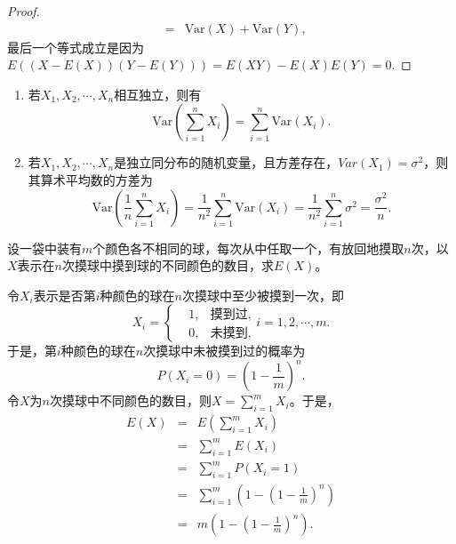 \begin{property}
\begin{enumerate}
\begin{enumerate}
\begin{proof}
\begin{eqnarray*}
        &=& \text{Var}(X)+\text{Var}(Y),
    \end{eqnarray*}
    最后一个等式成立是因为$E((X - E(X))(Y-E(Y))) = E(XY) - E(X)E(Y) = 0$.
    \end{proof}
    \begin{remark}
    \begin{enumerate}
        \item 若$X_1,X_2,\cdots,X_n$相互独立，则有
        $$
        \text{Var}\left(\sum_{i=1}^n X_i\right) = \sum_{i=1}^n \text{Var}(X_i).
        $$
        \item  若$X_1,X_2,\cdots,X_n$是独立同分布的随机变量，且方差存在，$Var(X_1) = \sigma^2$，则其算术平均数的方差为
        $$
       \text{Var}\left(\frac{1}{n}\sum_{i=1}^n X_i\right) = \frac{1}{n^2} \sum_{i=1}^n \text{Var}(X_i) = \frac{1}{n^2} \sum_{i=1}^n \sigma^2 = \frac{\sigma^2}{n}.
        $$
    \end{enumerate}
    \end{remark}
    \end{enumerate}
\end{enumerate}
\end{property}
\begin{example}
    设一袋中装有$m$个颜色各不相同的球，每次从中任取一个，有放回地摸取$n$次，以$X$表示在$n$次摸球中摸到球的不同颜色的数目，求$E(X)$。
\end{example}
\begin{solution}
令$X_i$表示是否第$i$种颜色的球在$n$次摸球中至少被摸到一次，即
$$
X_i = \left\{
\begin{aligned}
    & 1, & \text{摸到过,}\\
    & 0, & \text{未摸到,}
\end{aligned}\right.i=1,2,\cdots,m.
$$
于是，第$i$种颜色的球在$n$次摸球中未被摸到过的概率为
$$
P(X_i=0) = \left(1-\frac{1}{m} \right)^{n}. 
$$
令$X$为$n$次摸球中不同颜色的数目，则$X = \sum_{i=1}^m X_i$。于是，
\begin{eqnarray*}
    E(X) &=& E\left(\sum_{i=1}^m X_i \right)\\
    &=& \sum_{i=1}^m E(X_i)\\
    &=& \sum_{i=1}^m P(X_i = 1)\\
    &=& \sum_{i=1}^m \left(1-\left(1-\frac{1}{m} \right)^{n}\right)\\
    &=& m \left(1-\left(1-\frac{1}{m}\right)^{n} \right).
\end{eqnarray*}
\end{solution}
\begin{note}
 \vspace{5cm}   
\end{note}

